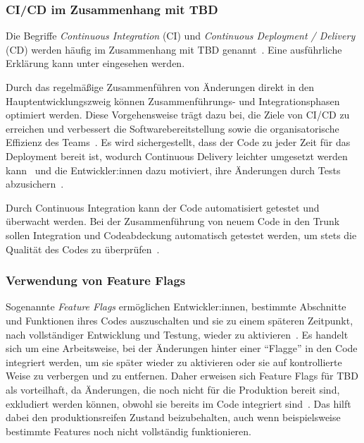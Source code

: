 \subsubsection{CI/CD im Zusammenhang mit TBD}

Die Begriffe \emph{Continuous Integration} (CI) und \emph{Continuous Deployment / Delivery} (CD) werden häufig im Zusammenhang mit TBD genannt~\cite{trunkbased1,trunkbased2,trunkbased3}. Eine ausführliche Erklärung kann unter \cite{gitlabWhatCICD2024} eingesehen werden.

Durch das regelmäßige Zusammenführen von Änderungen direkt in den Hauptentwicklungszweig können Zusammenführungs- und Integrationsphasen optimiert werden. Diese Vorgehensweise trägt dazu bei, die Ziele von CI/CD zu erreichen und verbessert die Softwarebereitstellung sowie die organisatorische Effizienz des Teams~\cite{trunkbased4}. Es wird sichergestellt, dass der Code zu jeder Zeit für das Deployment bereit ist, wodurch Continuous Delivery leichter umgesetzt werden kann~\cite{trunkbased5} und die Entwickler:innen dazu motiviert, ihre Änderungen durch Tests abzusichern~\cite{trunkbased2}.

Durch Continuous Integration kann der Code automatisiert getestet und überwacht werden. Bei der Zusammenführung von neuem Code in den Trunk sollen Integration und Codeabdeckung automatisch getestet werden, um stets die Qualität des Codes zu überprüfen~\cite{trunkbased4}.


\subsubsection{Verwendung von Feature Flags}

Sogenannte \emph{Feature Flags} ermöglichen Entwickler:innen, bestimmte Abschnitte und Funktionen ihres Codes auszuschalten und sie zu einem späteren Zeitpunkt, nach vollständiger Entwicklung und Testung, wieder zu aktivieren~\cite{trunkbased_featureflag2}. Es handelt sich um eine Arbeitsweise, bei der Änderungen hinter einer \enquote{Flagge} in den Code integriert werden, um sie später wieder zu aktivieren oder sie auf kontrollierte Weise zu verbergen und zu entfernen. Daher erweisen sich Feature Flags für TBD als vorteilhaft, da Änderungen, die noch nicht für die Produktion bereit sind, exkludiert werden können, obwohl sie bereits im Code integriert sind~\cite{trunkbased_featureflag1}. Das hilft dabei den produktionsreifen Zustand beizubehalten, auch wenn beispielsweise bestimmte Features noch nicht vollständig funktionieren.

